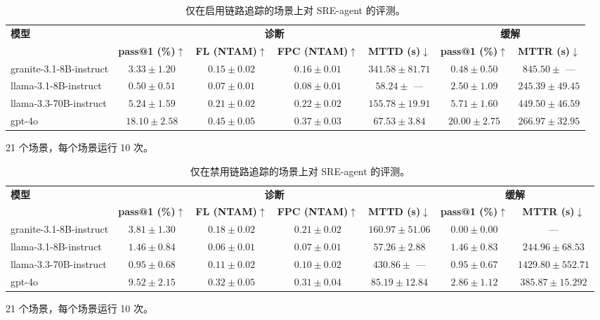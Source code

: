 \begin{table}[H]
\centering
\caption{仅在启用链路追踪的场景上对 SRE-agent 的评测。}
\label{tab:itb-tab19}
\begin{adjustbox}{max width=\linewidth}
\begin{tabular}{lcccccc}
\toprule
\multirow{2}{*}{\textbf{模型}} & \multicolumn{4}{c}{\textbf{诊断}} & \multicolumn{2}{c}{\textbf{缓解}} \\
\cmidrule(lr){2-5}\cmidrule(lr){6-7}
 & \textbf{pass@1 (\%)$\uparrow$} & \textbf{FL (NTAM)$\uparrow$} & \textbf{FPC (NTAM)$\uparrow$} & \textbf{MTTD (s)$\downarrow$} & \textbf{pass@1 (\%)$\uparrow$} & \textbf{MTTR (s)$\downarrow$} \\
\midrule
granite-3.1-8B-instruct & $3.33 \pm 1.20$ & $0.15 \pm 0.02$ & $0.16 \pm 0.01$ & $341.58 \pm 81.71$ & $0.48 \pm 0.50$ & $845.50\pm$ — \\
llama-3.1-8B-instruct & $0.50 \pm 0.51$ & $0.07 \pm 0.01$ & $0.08 \pm 0.01$ & $58.24\pm$ — & $2.50 \pm 1.09$ & $245.39 \pm 49.45$ \\
llama-3.3-70B-instruct & $5.24 \pm 1.59$ & $0.21 \pm 0.02$ & $0.22 \pm 0.02$ & $155.78 \pm 19.91$ & $5.71 \pm 1.60$ & $449.50 \pm 46.59$ \\
gpt-4o & $18.10 \pm 2.58$ & $0.45 \pm 0.05$ & $0.37 \pm 0.03$ & $67.53 \pm 3.84$ & $20.00 \pm 2.75$ & $266.97 \pm 32.95$ \\
\bottomrule
\end{tabular}
\end{adjustbox}

\footnotesize 21 个场景，每个场景运行 10 次。
\end{table}

\begin{table}[H]
\centering
\caption{仅在禁用链路追踪的场景上对 SRE-agent 的评测。}
\label{tab:itb-tab20}
\begin{adjustbox}{max width=\linewidth}
\begin{tabular}{lcccccc}
\toprule
\multirow{2}{*}{\textbf{模型}} & \multicolumn{4}{c}{\textbf{诊断}} & \multicolumn{2}{c}{\textbf{缓解}} \\
\cmidrule(lr){2-5}\cmidrule(lr){6-7}
 & \textbf{pass@1 (\%)$\uparrow$} & \textbf{FL (NTAM)$\uparrow$} & \textbf{FPC (NTAM)$\uparrow$} & \textbf{MTTD (s)$\downarrow$} & \textbf{pass@1 (\%)$\uparrow$} & \textbf{MTTR (s)$\downarrow$} \\
\midrule
granite-3.1-8B-instruct & $3.81 \pm 1.30$ & $0.18 \pm 0.02$ & $0.21 \pm 0.02$ & $160.97 \pm 51.06$ & $0.00 \pm 0.00$ & — \\
llama-3.1-8B-instruct & $1.46 \pm 0.84$ & $0.06 \pm 0.01$ & $0.07 \pm 0.01$ & $57.26 \pm 2.88$ & $1.46 \pm 0.83$ & $244.96 \pm 68.53$ \\
llama-3.3-70B-instruct & $0.95 \pm 0.68$ & $0.11 \pm 0.02$ & $0.10 \pm 0.02$ & $430.86\pm$ — & $0.95 \pm 0.67$ & $1429.80 \pm 552.71$ \\
gpt-4o & $9.52 \pm 2.15$ & $0.32 \pm 0.05$ & $0.31 \pm 0.04$ & $85.19 \pm 12.84$ & $2.86 \pm 1.12$ & $385.87 \pm 15.292$ \\
\bottomrule
\end{tabular}
\end{adjustbox}

\footnotesize 21 个场景，每个场景运行 10 次。
\end{table}
